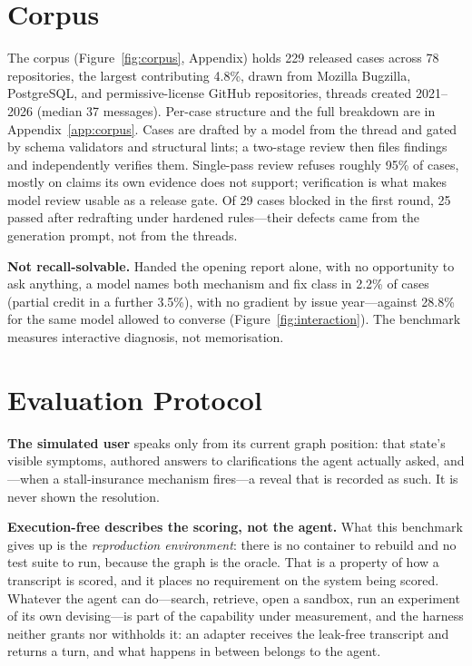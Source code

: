 \documentclass{article} %
\begin{document}
\section{Corpus}
\label{sec:corpus}

The corpus (Figure~\ref{fig:corpus}, Appendix) holds 229 released cases across 78
repositories, the largest contributing 4.8\%, drawn from Mozilla
Bugzilla, PostgreSQL, and permissive-license GitHub repositories, threads
created 2021--2026 (median 37 messages). Per-case structure and the full
breakdown are in Appendix~\ref{app:corpus}. Cases are drafted by a model
from the thread and gated by schema validators and structural lints; a
two-stage review then files findings and independently verifies them.
Single-pass review refuses roughly 95\% of cases, mostly on claims its
own evidence does not support; verification is what makes model review
usable as a release gate. Of 29 cases blocked in the first round, 25
passed after redrafting under hardened rules---their defects came from
the generation prompt, not from the threads.

\textbf{Not recall-solvable.} Handed the opening report alone, with no
opportunity to ask anything, a model names both mechanism and fix class
in 2.2\% of cases (partial credit in a further 3.5\%), with no gradient
by issue year---against 28.8\% for the same model allowed to converse
(Figure~\ref{fig:interaction}). The benchmark measures interactive diagnosis, not
memorisation.

\section{Evaluation Protocol}
\label{sec:protocol}

\textbf{The simulated user} speaks only from its current graph position:
that state's visible symptoms, authored answers to clarifications the
agent actually asked, and---when a stall-insurance mechanism fires---a
reveal that is recorded as such. It is never shown the resolution.

\textbf{Execution-free describes the scoring, not the agent.} What this
benchmark gives up is the \emph{reproduction environment}: there is no
container to rebuild and no test suite to run, because the graph is the
oracle. That is a property of how a transcript is scored, and it places
no requirement on the system being scored. Whatever the agent can
do---search, retrieve, open a sandbox, run an experiment of its own
devising---is part of the capability under measurement, and the harness
neither grants nor withholds it: an adapter receives the leak-free
transcript and returns a turn, and what happens in between belongs to
the agent.
\end{document}
